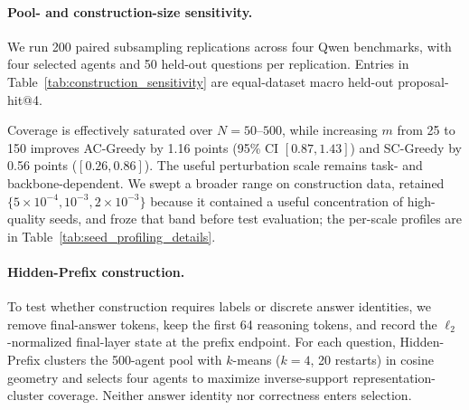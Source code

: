 \paragraph{Pool- and construction-size sensitivity.}
We run 200 paired subsampling replications across four Qwen benchmarks, with
four selected agents and 50 held-out questions per replication. Entries in
Table~\ref{tab:construction_sensitivity} are equal-dataset macro held-out
proposal-hit@4.

\begin{table}[H]
\centering
\caption{Sensitivity to candidate-pool size $N$ and construction-set size $m$.
Each arrow follows the increasing values shown in the column header.}
\label{tab:construction_sensitivity}
\small
{}
\end{table}

Coverage is effectively saturated over $N=50$--$500$, while increasing $m$
from 25 to 150 improves AC-Greedy by 1.16 points (95\% CI $[0.87,1.43]$) and
SC-Greedy by 0.56 points ($[0.26,0.86]$). The useful perturbation scale remains
task- and backbone-dependent. We swept a broader range on construction data,
retained $\{5\times10^{-4},10^{-3},2\times10^{-3}\}$ because it contained a
useful concentration of high-quality seeds, and froze that band before test
evaluation; the per-scale profiles are in
Table~\ref{tab:seed_profiling_details}.

\paragraph{Hidden-Prefix construction.}
To test whether construction requires labels or discrete answer identities, we
remove final-answer tokens, keep the first 64 reasoning tokens, and record the
$\ell_2$-normalized final-layer state at the prefix endpoint. For each
question, Hidden-Prefix clusters the 500-agent pool with $k$-means ($k=4$, 20
restarts) in cosine geometry and selects four agents to maximize
inverse-support representation-cluster coverage. Neither answer identity nor
correctness enters selection.

